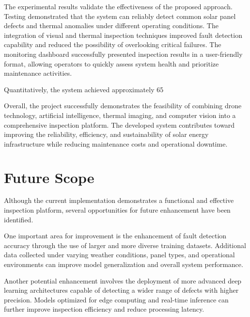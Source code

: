 The experimental results validate the effectiveness of the proposed approach. Testing demonstrated that the system can reliably detect common solar panel defects and thermal anomalies under different operating conditions. The integration of visual and thermal inspection techniques improved fault detection capability and reduced the possibility of overlooking critical failures. The monitoring dashboard successfully presented inspection results in a user-friendly format, allowing operators to quickly assess system health and prioritize maintenance activities.

Quantitatively, the system achieved approximately 65%

Overall, the project successfully demonstrates the feasibility of combining drone technology, artificial intelligence, thermal imaging, and computer vision into a comprehensive inspection platform. The developed system contributes toward improving the reliability, efficiency, and sustainability of solar energy infrastructure while reducing maintenance costs and operational downtime.

\section{Future Scope}

Although the current implementation demonstrates a functional and effective inspection platform, several opportunities for future enhancement have been identified.

One important area for improvement is the enhancement of fault detection accuracy through the use of larger and more diverse training datasets. Additional data collected under varying weather conditions, panel types, and operational environments can improve model generalization and overall system performance.

Another potential enhancement involves the deployment of more advanced deep learning architectures capable of detecting a wider range of defects with higher precision. Models optimized for edge computing and real-time inference can further improve inspection efficiency and reduce processing latency.

